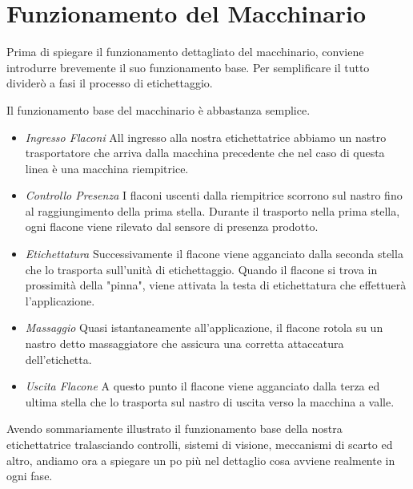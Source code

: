 \documentclass[12pt, a4paper, oneside]{book}
\begin{document}
\section{Funzionamento del Macchinario}
Prima di spiegare il funzionamento dettagliato del macchinario, conviene introdurre brevemente il suo funzionamento base. Per semplificare il tutto dividerò a fasi il processo di etichettaggio.

Il funzionamento base del macchinario è abbastanza semplice. 
\begin{itemize}
	\item \textit{Ingresso Flaconi} All ingresso alla nostra etichettatrice abbiamo un nastro trasportatore che arriva dalla macchina precedente che nel caso di questa linea è una macchina riempitrice.
	\item \textit{Controllo Presenza}  I flaconi uscenti dalla riempitrice scorrono sul nastro fino al raggiungimento della prima stella. Durante il trasporto nella prima stella, ogni flacone viene rilevato dal sensore di presenza prodotto.
	\item \textit{Etichettatura} Successivamente il flacone viene agganciato dalla seconda stella che lo trasporta sull'unità di etichettaggio. Quando il flacone si trova in prossimità della "pinna", viene attivata la testa di etichettatura che effettuerà l'applicazione.
	\item \textit{Massaggio} Quasi istantaneamente all'applicazione, il flacone rotola su un nastro detto massaggiatore che assicura una corretta attaccatura dell'etichetta.
	\item \textit{Uscita Flacone} A questo punto il flacone viene agganciato dalla terza ed ultima stella che lo trasporta sul nastro di uscita verso la macchina a valle. 
\end{itemize}

Avendo sommariamente illustrato il funzionamento base della nostra etichettatrice tralasciando controlli, sistemi di visione, meccanismi di scarto ed altro, andiamo ora a spiegare un po più nel dettaglio cosa avviene realmente in ogni fase.
\end{document}
